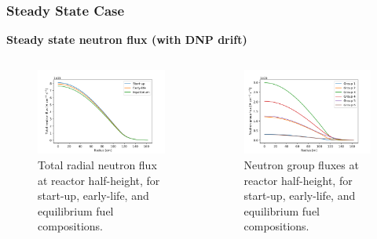 \begin{frame}
	\frametitle{Steady State Case}
		\textbf{Steady state neutron flux (with \gls{DNP} drift)}
		\begin{columns}
			\column{5cm}
			\begin{figure}
				\centering
				\includegraphics[width=\textwidth]{../paper/figures/totalflux}
				\caption{\small Total radial neutron flux at reactor
				half-height, for start-up, early-life, and equilibrium fuel
				compositions.}
				\label{fig:totalflux}
			\end{figure}
			\column{5cm}
			\begin{figure}
				\centering
				\includegraphics[width=\textwidth]{../paper/figures/stflux}
				\caption{\small Neutron group fluxes at reactor half-height, for
				start-up, early-life, and equilibrium fuel compositions.}
				\label{fig:stflux}
			\end{figure}
		\end{columns}
\end{frame}

